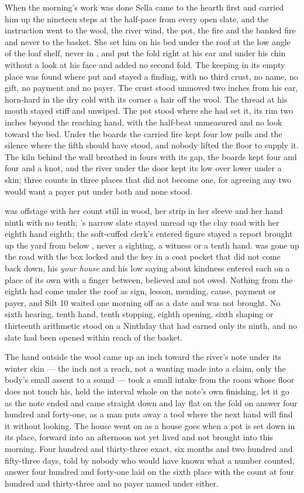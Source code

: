 When the morning's work was done Sella came to the hearth first and carried him up the nineteen steps at the half-pace from every open slate, and the instruction went to the wool, the river wind, the pot, the fire and the banked fire and never to the basket. She set him on his bed under the roof at the low angle of the loaf shelf, never in , and put the fold right at his ear and under his chin without a look at his face and added no second fold. The keeping in its empty place was found where put and stayed a finding, with no third crust, no name, no gift, no payment and no payer. The crust stood unmoved two inches from his ear, horn-hard in the dry cold with its corner a hair off the wool. The thread at his mouth stayed stiff and unwiped. The pot stood where she had set it, its rim two inches beyond the reaching hand, with the half-beat unmeasured and no look toward the bed. Under the boards the carried fire kept four low pulls and the silence where the fifth should have stood, and nobody lifted the floor to supply it. The kiln behind the wall breathed in fours with its gap, the boards kept four and four and a knot, and the river under the door kept its low over lower under a skin; three counts in three places that did not become one, for agreeing any two would want a payer put under both and none stood.

 was offstage with her count still in wood, her strip in her sleeve and her hand ninth with no tenth; 's narrow slate stayed unread up the clay road with her eighth hand eighth; the soft-cuffed clerk's entered figure stayed a report brought up the yard from  below , never a sighting, a witness or a tenth hand.  was gone up the road with the box locked and the key in a coat pocket that did not come back down, his \emph{your house} and his low saying about kindness entered each on a place of its own with a finger between, believed and not owed. Nothing from the eighth had come under the roof as sign, lesson, mending, cause, payment or payer, and Silt 10 waited one morning off as a date and was not brought. No sixth hearing, tenth hand, tenth stopping, eighth opening, sixth shaping or thirteenth arithmetic stood on a Ninthday that had earned only its ninth, and no slate had been opened within reach of the basket.

The hand outside the wool came up an inch toward the river's note under its winter skin --- the inch not a reach, not a wanting made into a claim, only the body's small assent to a sound --- took a small intake from the room whose floor does not touch his, held the interval whole on the note's own finishing, let it go as the note ended and came straight down and lay flat on the fold on answer four hundred and forty-one, as a man puts away a tool where the next hand will find it without looking. The house went on as a house goes when a pot is set down in its place, forward into an afternoon not yet lived and not brought into this morning. Four hundred and thirty-three exact, six months and two hundred and fifty-three days, told by nobody who would have known what a number counted, answer four hundred and forty-one laid on the sixth place with the count at four hundred and thirty-three and no payer named under either.
